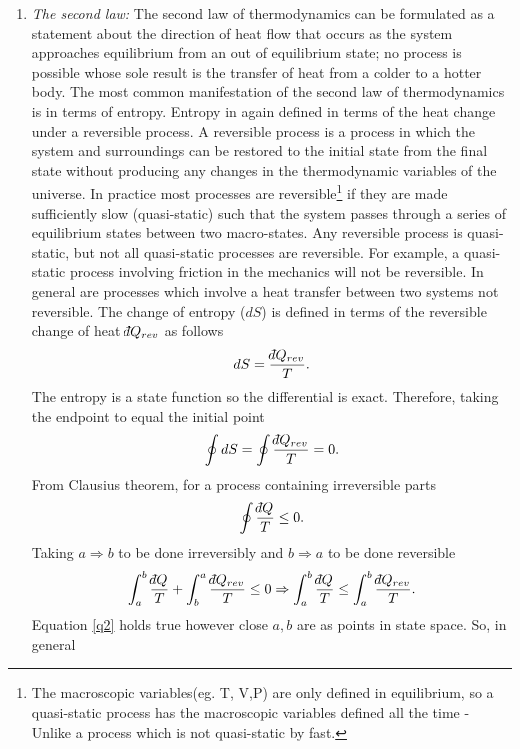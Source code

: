\begin{enumerate}
	\item \emph{The second law:} The second law of thermodynamics can be formulated as a statement about the direction of heat flow that occurs as the system approaches equilibrium from an out of equilibrium state; no process is possible whose sole result is the transfer of heat from a colder to a hotter body. The most common manifestation of the second law of thermodynamics is in terms of entropy. Entropy in again defined in terms of the heat change under a reversible process. A reversible process is a process in which the system and surroundings can be restored to the initial state from the final state without producing any changes in the thermodynamic variables of the universe. In practice most processes are reversible\footnote{The macroscopic variables(eg. T, V,P) are only defined in equilibrium, so a quasi-static process has the macroscopic variables defined all the time - Unlike a process which is not quasi-static by fast.} if they are made sufficiently slow (quasi-static) such that the system passes through a series of equilibrium states between two macro-states. Any reversible process is quasi-static, but not all quasi-static processes are reversible. For example, a quasi-static process involving friction in the mechanics will not be reversible. In general are processes which involve a heat transfer between two systems not reversible. The change of entropy ($dS$) is defined in terms of the reversible change of heat $\dbar Q_{rev}$ as follows
	\begin{equation}
		dS=\frac{\dbar Q_{rev}}{T}.
	\end{equation} 
	The entropy is a state function so the differential is exact. Therefore, taking the endpoint to equal the initial point
	\begin{equation}
		\oint dS=\oint \frac{\dbar Q_{rev}}{T}=0.
		\label{ss1}
	\end{equation} 
	From Clausius theorem, for a process containing irreversible parts~\citep{blundell}
	\begin{equation}
		\oint \frac{\dbar Q}{T}\leq 0.
		\label{q1}
	\end{equation} 
	Taking $a\Rightarrow b$ to be done irreversibly and $b\Rightarrow a$ to be done reversible
	\begin{equation}
		\int_{a}^{b}\frac{\dbar Q}{T}+\int_{b}^{a}\frac{\dbar Q_{rev}}{T}\leq 0\Rightarrow \int_a^b\frac{\dbar Q}{T}\leq \int_{a}^{b}\frac{\dbar Q_{rev}}{T}.
		\label{q2}
	\end{equation} 
	Equation \eqref{q2} holds true however close $a,b$ are as points in state space. So, in general

\end{enumerate}
